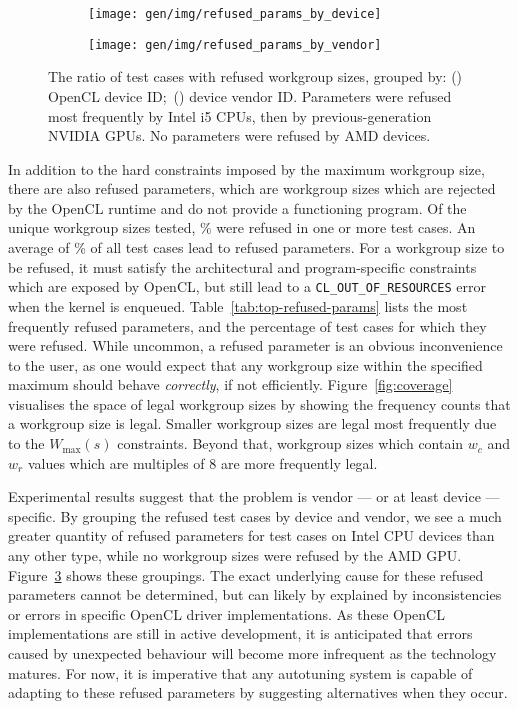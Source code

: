 \begin{figure}
\centering
\begin{subfigure}[h]{.45\textwidth}
  \centering
  \texttt{[image: gen/img/refused\_params\_by\_device]}
  \caption{}
  \label{fig:refused-params-by-device}
\end{subfigure}
\hfill
\begin{subfigure}[h]{.45\textwidth}
  \centering
  \texttt{[image: gen/img/refused\_params\_by\_vendor]}
  \caption{}
  \label{fig:refused-params-by-vendor}
\end{subfigure}
\caption{%
  The ratio of test cases with refused workgroup sizes, grouped by:
  () OpenCL device ID;\
  () device vendor ID. Parameters
  were refused most frequently by Intel i5 CPUs, then by
  previous-generation NVIDIA GPUs. No parameters were refused by AMD
  devices.%
}
\label{fig:refused-params-by-dev-vendor}
\end{figure}

In addition to the hard constraints imposed by the maximum workgroup
size, there are also refused parameters, which are workgroup sizes
which are rejected by the OpenCL runtime and do not provide a
functioning program. Of the  unique workgroup
sizes tested, \% were refused in one
or more test cases. An average of
\% of all test cases lead to
refused parameters. For a workgroup size to be refused, it must
satisfy the architectural and program-specific constraints which are
exposed by OpenCL, but still lead to a \texttt{CL\_OUT\_OF\_RESOURCES}
error when the kernel is enqueued. Table~\ref{tab:top-refused-params}
lists the most frequently refused parameters, and the percentage of
test cases for which they were refused. While uncommon, a refused
parameter is an obvious inconvenience to the user, as one would expect
that any workgroup size within the specified maximum should behave
\emph{correctly}, if not efficiently. Figure~\ref{fig:coverage}
visualises the space of legal workgroup sizes by showing the frequency
counts that a workgroup size is legal. Smaller workgroup sizes are
legal most frequently due to the $W_{\max}(s)$ constraints. Beyond
that, workgroup sizes which contain $w_c$ and $w_r$ values which are
multiples of 8 are more frequently legal.

Experimental results suggest that the problem is vendor --- or at
least device --- specific. By grouping the refused test cases by
device and vendor, we see a much greater quantity of refused
parameters for test cases on Intel CPU devices than any other type,
while no workgroup sizes were refused by the AMD
GPU. Figure~\ref{fig:refused-params-by-dev-vendor} shows these
groupings. The exact underlying cause for these refused parameters
cannot be determined, but can likely by explained by inconsistencies
or errors in specific OpenCL driver implementations. As these OpenCL
implementations are still in active development, it is anticipated
that errors caused by unexpected behaviour will become more infrequent
as the technology matures. For now, it is imperative that any
autotuning system is capable of adapting to these refused parameters
by suggesting alternatives when they occur.

